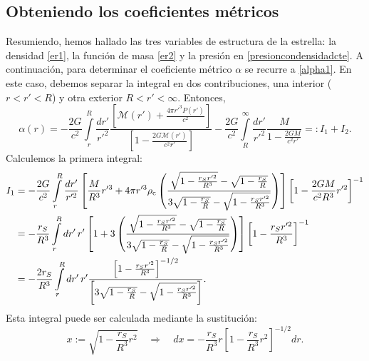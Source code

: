 \subsection{Obteniendo los coeficientes métricos}
Resumiendo, hemos hallado las tres variables de estructura de la estrella: la densidad \eqref{er1}, la función de masa \eqref{er2} y la presión en \eqref{presioncondensidadcte}. A continuación, para determinar el coeficiente métrico $\alpha$ se recurre a \eqref{alpha1}. En este caso, debemos separar la integral en dos contribuciones, una interior ($r<r'<R$) y otra exterior $R<r'<\infty$. Entonces,
\begin{equation}
\alpha(r)=-\frac{2G}{c^2}\int\limits_r^R\frac{dr'}{r'^2}\frac{\left[ \mathcal{M}(r')+\frac{4\pi r'^3P(r')}{c^2}\right]}{\left[ 1-\frac{2G\mathcal{M}(r')}{c^2r'}\right]}
-\frac{2G}{c^2}\int\limits_R^{\infty}\frac{dr'}{r'^2}\frac{M}{1-\frac{2GM}{c^2r'}}=:I_1+I_2.
\end{equation}
Calculemos la primera integral:
\begin{align}
I_1 &=-\frac{2G}{c^2}\int\limits_r^R \frac{dr'}{r'^2}\left[ \frac{M}{R^3}r'^3+4\pi r'^3\rho_{\rm c}\left(\frac{\sqrt{1-\frac{r_Sr'^2}{R^3}}-\sqrt{1-\frac{r_S}{R}}}{ 3 \sqrt{1-\frac{r_S}{R}}-\sqrt{1-\frac{r_Sr'^2}{R^3}}}\right)\right]\left[ 1-\frac{2GM}{c^2R^3}r'^2\right]^{-1}\\
&=-\frac{r_S}{R^3}\int\limits_r^R dr'\,r'\left[ 1+3 \left(\frac{\sqrt{1-\frac{r_Sr'^2}{R^3}}-\sqrt{1-\frac{r_S}{R}}}{ 3 \sqrt{1-\frac{r_S}{R}}-\sqrt{1-\frac{r_Sr'^2}{R^3}}}\right)\right]\left[ 1-\frac{r_Sr'^2}{R^3}\right]^{-1}\\
&=-\frac{2r_S}{R^3}\int\limits_r^R dr'\,r'\frac{\left[ 1-\frac{r_Sr'^2}{R^3}\right]^{-1/2}}{\left[3\sqrt{1-\frac{r_S}{R}}-\sqrt{1-\frac{r_Sr'^2}{R^3}}\right]}.
\end{align}
Esta integral puede ser calculada mediante la sustitución:
\begin{equation}
x:=\sqrt{1-\frac{r_S}{R^3}r^2}\quad\Rightarrow\quad dx=-\frac{r_S}{R^3}r\left[1-\frac{r_S}{R^3}r^2\right]^{-1/2}dr.
\end{equation}
